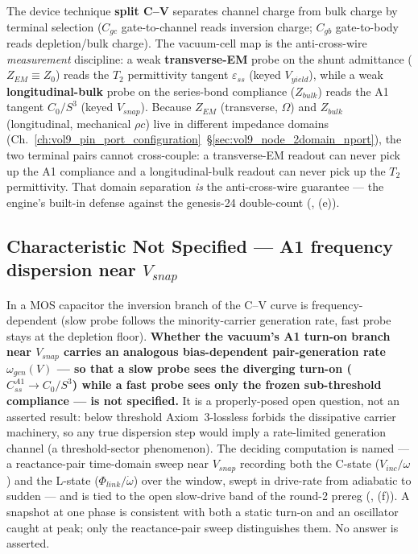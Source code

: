The device technique \textbf{split C--V} separates channel charge from bulk charge
by terminal selection ($C_{gc}$ gate-to-channel reads inversion charge; $C_{gb}$
gate-to-body reads depletion/bulk charge). The vacuum-cell map is the
anti-cross-wire \emph{measurement} discipline: a weak \textbf{transverse-EM} probe
on the shunt admittance ($Z_{EM} \equiv Z_0$) reads the $T_2$ permittivity tangent
$\varepsilon_{ss}$ (keyed $V_{yield}$), while a weak \textbf{longitudinal-bulk}
probe on the series-bond compliance ($Z_{bulk}$) reads the A1 tangent $C_0/S^3$
(keyed $V_{snap}$). Because $Z_{EM}$ (transverse, $\Omega$) and $Z_{bulk}$
(longitudinal, mechanical $\rho c$) live in different impedance domains
(Ch.~\ref{ch:vol9_pin_port_configuration}~\S\ref{sec:vol9_node_2domain_nport}),
the two terminal pairs cannot cross-couple: a transverse-EM readout can never pick
up the A1 compliance and a longitudinal-bulk readout can never pick up the $T_2$
permittivity. That domain separation \emph{is} the anti-cross-wire guarantee ---
the engine's built-in defense against the genesis-24 double-count
(, (e)).

\subsection{Characteristic Not Specified --- A1 frequency dispersion near $V_{snap}$}
\label{subsec:vol9_cv_not_specified}

\begin{warningbox}
In a MOS capacitor the inversion branch of the C--V curve is
frequency-dependent (slow probe follows the minority-carrier generation rate,
fast probe stays at the depletion floor). \textbf{Whether the vacuum's A1 turn-on
branch near $V_{snap}$ carries an analogous bias-dependent pair-generation rate
$\omega_{gen}(V)$ --- so that a slow probe sees the diverging turn-on
($C_{ss}^{A1}\to C_0/S^3$) while a fast probe sees only the frozen sub-threshold
compliance --- is not specified.} It is a properly-posed open question, not an
asserted result: below threshold Axiom~3-lossless forbids the dissipative carrier
machinery, so any true dispersion step would imply a rate-limited generation
channel (a threshold-sector phenomenon). The deciding computation is named ---
a reactance-pair time-domain sweep near $V_{snap}$ recording both the C-state
($V_{inc}/\omega$) and the L-state ($\Phi_{link}/\dot\omega$) over the window,
swept in drive-rate from adiabatic to sudden --- and is tied to the open
slow-drive band of the round-2 prereg
(, (f)). A snapshot at
one phase is consistent with both a static turn-on and an oscillator caught at
peak; only the reactance-pair sweep distinguishes them. No answer is asserted.
\end{warningbox}


